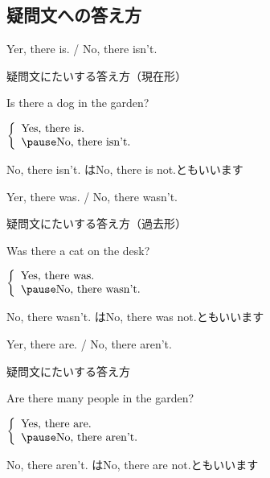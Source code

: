 \documentclass[aspectratio=169,xcolor={dvipsnames,table}]{beamer}
\newcommand{\myaudio}[1]{\href{#1}{\faVolumeUp}}
\begin{document}
\subsection{疑問文への答え方}
 \begin{frame}[plain]{Yer, there is. / No, there isn't.}
 \Large

疑問文にたいする答え方（現在形）\hfill\myaudio{./audio/001_there_is_09.mp3}
\vspace{10pt}

\pause

Is there a dog in the garden?

\pause

$\left\{\begin{array}{l}
	 \text{Yes, there is.}\\\pause
         \text{No, there isn't.}
	\end{array}\right.$

\pause

\mbox{}\hfill{}{\small No, there isn't. はNo, there is not.ともいいます}
\end{frame}
 \begin{frame}[plain]{Yer, there was. / No, there wasn't.}
 \Large

疑問文にたいする答え方（過去形）\hfill\myaudio{./audio/001_there_is_10.mp3}
\vspace{10pt}

\pause
Was there a cat on the desk?

\pause

$\left\{\begin{array}{l}
	 \text{Yes, there was.}\\\pause
         \text{No, there wasn't.}
	\end{array}\right.$

\pause

\mbox{}\hfill{}{\small No, there wasn't. はNo, there was not.ともいいます}
\end{frame}
 \begin{frame}[plain]{Yer, there are. / No, there aren't.}
 \Large

疑問文にたいする答え方\hfill\myaudio{./audio/001_there_is_11.mp3}
\vspace{10pt}

\pause

Are there many people in the garden?

\pause 

$\left\{\begin{array}{l}
	 \text{Yes, there are.}\\\pause
         \text{No, there aren't.}
	\end{array}\right.$

\pause

\mbox{}\hfill{}{\small No, there aren't. はNo, there are not.ともいいます}
\end{frame}
\end{document}
